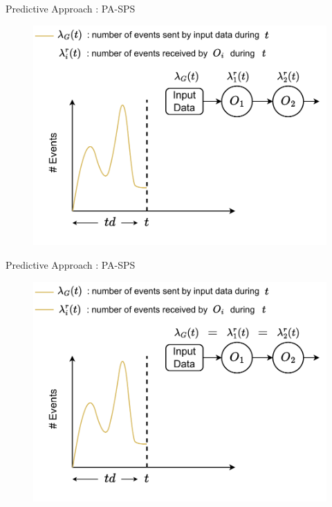 \begin{frame}{Predictive Approach : PA-SPS}
\begin{figure}
    \centering
    \includegraphics[scale=0.63]{images/concepts/predictive/PA-SPS-Prediction-2.pdf}
\end{figure}
\end{frame}

\begin{frame}{Predictive Approach : PA-SPS}
\begin{figure}
    \centering
    \includegraphics[scale=0.63]{images/concepts/predictive/PA-SPS-Prediction-3.pdf}
\end{figure}
\end{frame}

